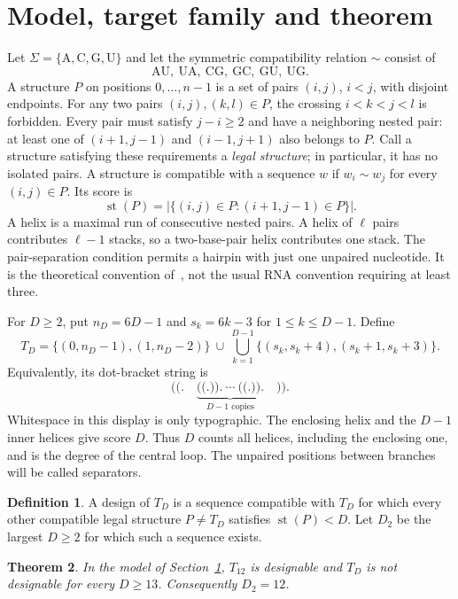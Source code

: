 \documentclass[11pt,a4paper]{article}
\newtheorem{theorem}{Theorem}
\theoremstyle{definition}
\newtheorem{definition}[theorem]{Definition}
\newcommand{\score}{\operatorname{st}}
\newcommand{\comp}{\mathrel{\sim}}
\begin{document}
\section{Model, target family and theorem}\label{sec:model}
Let $\Sigma=\{\mathrm A,\mathrm C,\mathrm G,\mathrm U\}$ and let the
symmetric compatibility relation $\comp$ consist of
\[
 \mathrm{AU},\ \mathrm{UA},\ \mathrm{CG},\ \mathrm{GC},\
 \mathrm{GU},\ \mathrm{UG}.
\]
A structure $P$ on positions $0,\ldots,n-1$ is a set of pairs $(i,j)$,
$i<j$, with disjoint endpoints. For any two pairs $(i,j),(k,l)\in P$,
the crossing $i<k<j<l$ is forbidden.
Every pair must satisfy $j-i\geq2$ and have a neighboring nested pair:
at least one of $(i+1,j-1)$ and $(i-1,j+1)$ also belongs to $P$.
Call a structure satisfying these requirements a \emph{legal structure};
in particular, it has no isolated pairs. A structure is compatible
with a sequence $w$ if $w_i\comp w_j$ for every $(i,j)\in P$.
Its score is
\[
 \score(P)=\bigl|\{(i,j)\in P:(i+1,j-1)\in P\}\bigr|.
\]
A helix is a maximal run of consecutive nested pairs. A helix of
$\ell$ pairs contributes $\ell-1$ stacks, so a two-base-pair helix
contributes one stack. The pair-separation condition permits a
hairpin with just one unpaired nucleotide. It is the theoretical
convention of~\cite[Section~2]{BBP}, not the usual RNA convention
requiring at least three.

For $D\geq2$, put $n_D=6D-1$ and $s_k=6k-3$ for $1\leq k\leq D-1$.
Define
\begin{equation}\label{eq:target}
 T_D=\{(0,n_D-1),(1,n_D-2)\}
 \ \cup\ \bigcup_{k=1}^{D-1}\{(s_k,s_k+4),(s_k+1,s_k+3)\}.
\end{equation}
Equivalently, its dot-bracket string is
\[
 \texttt{((.}\quad
 \underbrace{\texttt{((.)).}\ \cdots\ \texttt{((.)).}}_{D-1\text{ copies}}
 \quad\texttt{))}.
\]
Whitespace in this display is only typographic. The enclosing helix
and the $D-1$ inner helices give score $D$. Thus $D$ counts all helices,
including the enclosing one, and is the degree of the central loop.
The unpaired positions between branches will be called separators.

\begin{definition}
A design of $T_D$ is a sequence compatible with $T_D$ for which every
other compatible legal structure $P\ne T_D$ satisfies $\score(P)<D$.
Let $D_2$ be the largest $D\geq2$ for which such a sequence exists.
\end{definition}

\begin{theorem}\label{thm:main}
In the model of Section~\ref{sec:model}, $T_{12}$ is designable and
$T_D$ is not designable for every $D\geq13$. Consequently $D_2=12$.
\end{theorem}
\end{document}

